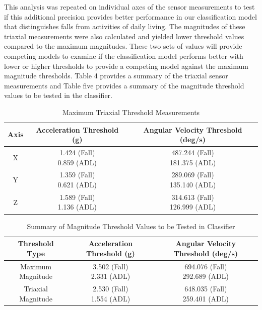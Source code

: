 \documentclass{llncs}
\begin{document}
	This analysis was repeated on individual axes of the sensor measurements to test if this additional precision provides better performance in our classification model that distinguishes falls from activities of daily living. The magnitudes of these triaxial measurements were also calculated and yielded lower threshold values compared to the maximum magnitudes. These two sets of values will provide competing models to examine if the classification model performs better with lower or higher thresholds to provide a competing model against the maximum magnitude thresholds. Table 4 provides a summary of the triaxial sensor measurements and Table five provides a summary of the magnitude threshold values to be tested in the classifier.
	
\begin{table}
	\begin{center}
		\caption{Maximum Triaxial Threshold Measurements}
		\label{table4}
		\begin{tabular}{|c|c|c|}
			\toprule
			Axis & Acceleration Threshold (g) & Angular Velocity Threshold (deg/s)\\
			\midrule
			X & \makecell{1.424 (Fall)\\0.859 (ADL)} & \makecell{487.244 (Fall)\\181.375 (ADL)}\\
			Y & \makecell{1.359 (Fall)\\0.621 (ADL)} & \makecell{289.069 (Fall)\\135.140 (ADL)}\\
			Z & \makecell{1.589 (Fall)\\1.136 (ADL)} & \makecell{314.613 (Fall)\\126.999 (ADL)}\\
			\bottomrule
		\end{tabular}
	\end{center}
\end{table}
	
 \begin{table}
 	\begin{center}
		\caption{Summary of Magnitude Threshold Values to be Tested in Classifier}
		\label{table5}
		\begin{tabular}{|c|c|c|}
			\toprule
			Threshold Type & Acceleration Threshold (g) & Angular Velocity Threshold (deg/s)\\
			\midrule
			Maximum Magnitude & \makecell{3.502 (Fall) \\2.331 (ADL)} & \makecell{694.076 (Fall) \\292.689 (ADL)}\\
			Triaxial Magnitude & \makecell{2.530 (Fall) \\1.554 (ADL)} & \makecell{648.035 (Fall) \\259.401 (ADL)}\\
			\bottomrule
		\end{tabular}
 	\end{center}
\end{table} 
    
\end{document}
